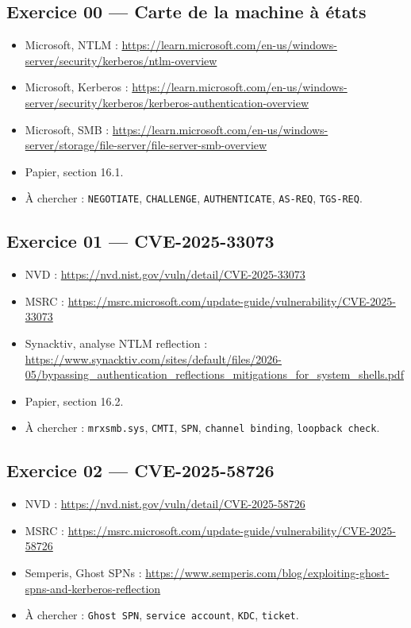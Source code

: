 \documentclass{training}
\begin{document}
\subsection*{Exercice 00 --- Carte de la machine à états}
\begin{itemize}
  \item Microsoft, NTLM :
        \url{https://learn.microsoft.com/en-us/windows-server/security/kerberos/ntlm-overview}
  \item Microsoft, Kerberos :
        \url{https://learn.microsoft.com/en-us/windows-server/security/kerberos/kerberos-authentication-overview}
  \item Microsoft, SMB :
        \url{https://learn.microsoft.com/en-us/windows-server/storage/file-server/file-server-smb-overview}
  \item Papier, section 16.1.
  \item À chercher : \texttt{NEGOTIATE}, \texttt{CHALLENGE},
        \texttt{AUTHENTICATE}, \texttt{AS-REQ}, \texttt{TGS-REQ}.
\end{itemize}

\subsection*{Exercice 01 --- CVE-2025-33073}
\begin{itemize}
  \item NVD : \url{https://nvd.nist.gov/vuln/detail/CVE-2025-33073}
  \item MSRC :
        \url{https://msrc.microsoft.com/update-guide/vulnerability/CVE-2025-33073}
  \item Synacktiv, analyse NTLM reflection :
        \url{https://www.synacktiv.com/sites/default/files/2026-05/bypassing_authentication_reflections_mitigations_for_system_shells.pdf}
  \item Papier, section 16.2.
  \item À chercher : \texttt{mrxsmb.sys}, \texttt{CMTI}, \texttt{SPN},
        \texttt{channel binding}, \texttt{loopback check}.
\end{itemize}

\subsection*{Exercice 02 --- CVE-2025-58726}
\begin{itemize}
  \item NVD : \url{https://nvd.nist.gov/vuln/detail/CVE-2025-58726}
  \item MSRC :
        \url{https://msrc.microsoft.com/update-guide/vulnerability/CVE-2025-58726}
  \item Semperis, Ghost SPNs :
        \url{https://www.semperis.com/blog/exploiting-ghost-spns-and-kerberos-reflection}
  \item À chercher : \texttt{Ghost SPN}, \texttt{service account},
        \texttt{KDC}, \texttt{ticket}.
\end{itemize}
\end{document}
